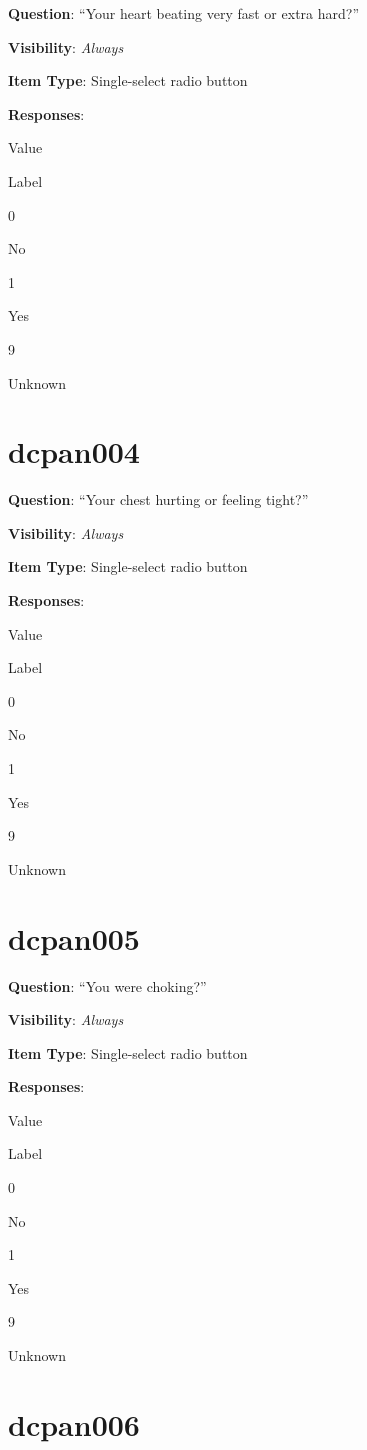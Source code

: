 \documentclass[]{book}
\begin{document}
\textbf{Question}: ``Your heart beating very fast or extra hard?''

\textbf{Visibility}: \emph{Always}

\textbf{Item Type}: Single-select radio button

\textbf{Responses}:

Value

Label

0

No

1

Yes

9

Unknown

\hypertarget{dcpan004}{%
\section{dcpan004}\label{dcpan004}}

\textbf{Question}: ``Your chest hurting or feeling tight?''

\textbf{Visibility}: \emph{Always}

\textbf{Item Type}: Single-select radio button

\textbf{Responses}:

Value

Label

0

No

1

Yes

9

Unknown

\hypertarget{dcpan005}{%
\section{dcpan005}\label{dcpan005}}

\textbf{Question}: ``You were choking?''

\textbf{Visibility}: \emph{Always}

\textbf{Item Type}: Single-select radio button

\textbf{Responses}:

Value

Label

0

No

1

Yes

9

Unknown

\hypertarget{dcpan006}{%
\section{dcpan006}\label{dcpan006}}
\end{document}
